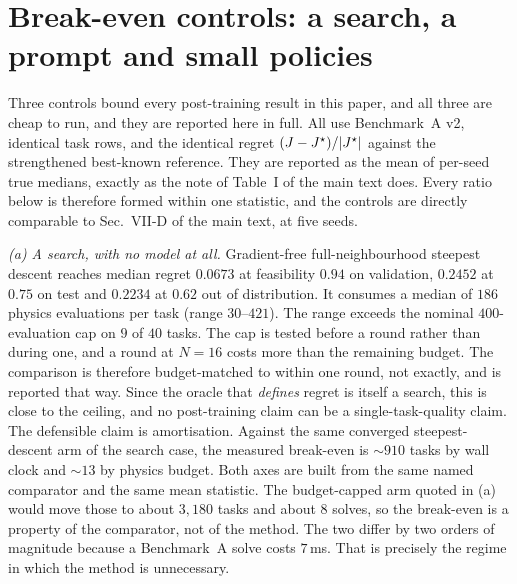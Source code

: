 \section{Break-even controls: a search, a prompt and small policies}
\label{supp:baselines}
Three controls bound every post-training result in this paper, and all three are
cheap to run, and they are reported here in full. All use Benchmark~A v2, identical task rows, and the identical
regret $(J-J^\star)/|J^\star|$ against the strengthened best-known
reference.  They are reported as the mean of per-seed true medians, exactly as the note of Table~I of the main text does.  Every ratio below is therefore formed within one statistic, and
the controls are directly comparable to Sec.~VII-D of the main text, at five seeds.

\emph{(a) A search, with no model at all.}  Gradient-free full-neighbourhood
steepest descent reaches median regret $0.0673$ at feasibility $0.94$ on validation,
$0.2452$
at $0.75$ on test and $0.2234$ at $0.62$ out of distribution.  It consumes a median
of $186$ physics evaluations per task (range $30$--$421$). The range exceeds the nominal
$400$-evaluation cap on $9$ of $40$ tasks.  The cap is tested before a round rather
than during one, and a round at $N{=}16$ costs more than the remaining budget.  The comparison is therefore budget-matched to within
one round, not exactly, and is reported that way. Since the oracle that \emph{defines} regret is itself a
search, this is close to the ceiling, and no post-training claim can be a
single-task-quality claim. The defensible claim is amortisation.  Against the same
converged steepest-descent arm of the search case, the measured break-even is
$\sim910$ tasks by
wall clock and $\sim13$ by physics budget.  Both axes are built from the same named
comparator and the same mean statistic.  The budget-capped arm quoted in (a) would
move those to about $3{,}180$ tasks and about $8$ solves, so the break-even is a
property of the comparator, not of the method.  The two differ by two
orders of magnitude because a Benchmark~A solve costs $7$\,ms.  That is precisely the
regime in which the method is unnecessary.

